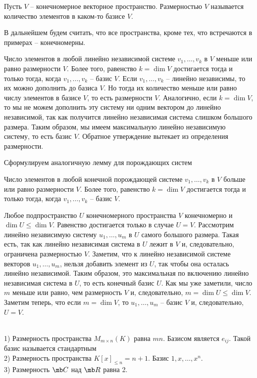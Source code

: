 \dfn[Размерность] Пусть $V$ -- конечномерное векторное пространство. Размерностью $V$ называется количество элементов в каком-то базисе $V$.
\edfn

\rm В дальнейшем будем считать, что все пространства, кроме тех, что встречаются в примерах -- конечномерны.
\erm

\lm Число элементов в любой линейно независимой системе $v_1,\dots,v_k$ в $V$ меньше или равно размерности $V$. Более того, равенство $k=\dim V$ достигается тогда и только тогда, когда $v_1,\dots,v_k$ -- базис $V$.
\elm
\proof Если $v_1,\dots,v_k$ -- линейно независимы, то их можно дополнить до базиса $V$. Но тогда их количество меньше или равно числу элементов в базисе $V$, то есть размерности $V$.
Аналогично, если $k=\dim V$, то мы не можем дополнить эту систему ни одним вектором до линейно независимой, так как получится линейно независимая система слишком большого размера. Таким образом, мы имеем максимальную линейно независимую систему, то есть базис $V$. Обратное утверждение вытекает из определения размерности.
\endproof

Сформулируем аналогичную лемму для порождающих систем

\lm Число элементов в любой конечной порождающей системе $v_1,\dots,v_k$ в $V$ больше или равно размерности $V$. Более того, равенство $k=\dim V$ достигается тогда и только тогда, когда $v_1,\dots,v_k$ -- базис $V$.
\elm



\thrm Любое подпространство $U$ конечномерного пространства $V$ конечномерно и $\dim U \leq \dim V$. Равенство достигается только в случае $U=V$.
\ethrm
\proof Рассмотрим линейно независимую систему $u_1,\dots,u_m$ в $U$ самого большого размера. Такая есть, так как линейно независимая система в $U$ лежит в $V$ и, следовательно, ограничена размерностью $V$. Заметим, что к линейно независимой системе векторов $ u_1,\dots,u_m $, нельзя добавить элемент из $U$, так чтобы она осталась линейно независимой. Таким образом, это максимальная по включению линейно независимая система в $U$, то есть конечный базис $U$. Как мы уже заметили, число $m$ меньше или равно, чем размерность $V$ и, следовательно, $m=\dim U \leq \dim V$. Заметим теперь, что если $m=\dim V$, то $u_1,\dots,u_m$ -- базис $V$ и, следовательно, $U=V$.
\endproof



\exm\\
1) Размерность пространства $M_{m\times n}(K)$ равна $mn$. Базисом является $e_{ij}$. Такой базис называется стандартным\\
2) Размерность пространства $K[x]_{\leq n}=n+1$. Базис $1,x,\dots,x^n$.\\
3) Размерность $\mb C$ над $\mb R$ равна 2.\\

